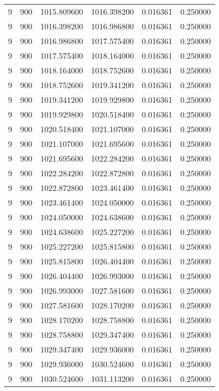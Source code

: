 \begin{longtable}{rrrrrr}
9 & 900 & 1015.809600 & 1016.398200 & 0.016361 & 0.250000 \\
9 & 900 & 1016.398200 & 1016.986800 & 0.016361 & 0.250000 \\
9 & 900 & 1016.986800 & 1017.575400 & 0.016361 & 0.250000 \\
9 & 900 & 1017.575400 & 1018.164000 & 0.016361 & 0.250000 \\
9 & 900 & 1018.164000 & 1018.752600 & 0.016361 & 0.250000 \\
9 & 900 & 1018.752600 & 1019.341200 & 0.016361 & 0.250000 \\
9 & 900 & 1019.341200 & 1019.929800 & 0.016361 & 0.250000 \\
9 & 900 & 1019.929800 & 1020.518400 & 0.016361 & 0.250000 \\
9 & 900 & 1020.518400 & 1021.107000 & 0.016361 & 0.250000 \\
9 & 900 & 1021.107000 & 1021.695600 & 0.016361 & 0.250000 \\
9 & 900 & 1021.695600 & 1022.284200 & 0.016361 & 0.250000 \\
9 & 900 & 1022.284200 & 1022.872800 & 0.016361 & 0.250000 \\
9 & 900 & 1022.872800 & 1023.461400 & 0.016361 & 0.250000 \\
9 & 900 & 1023.461400 & 1024.050000 & 0.016361 & 0.250000 \\
9 & 900 & 1024.050000 & 1024.638600 & 0.016361 & 0.250000 \\
9 & 900 & 1024.638600 & 1025.227200 & 0.016361 & 0.250000 \\
9 & 900 & 1025.227200 & 1025.815800 & 0.016361 & 0.250000 \\
9 & 900 & 1025.815800 & 1026.404400 & 0.016361 & 0.250000 \\
9 & 900 & 1026.404400 & 1026.993000 & 0.016361 & 0.250000 \\
9 & 900 & 1026.993000 & 1027.581600 & 0.016361 & 0.250000 \\
9 & 900 & 1027.581600 & 1028.170200 & 0.016361 & 0.250000 \\
9 & 900 & 1028.170200 & 1028.758800 & 0.016361 & 0.250000 \\
9 & 900 & 1028.758800 & 1029.347400 & 0.016361 & 0.250000 \\
9 & 900 & 1029.347400 & 1029.936000 & 0.016361 & 0.250000 \\
9 & 900 & 1029.936000 & 1030.524600 & 0.016361 & 0.250000 \\
9 & 900 & 1030.524600 & 1031.113200 & 0.016361 & 0.250000 \\

\end{longtable}
